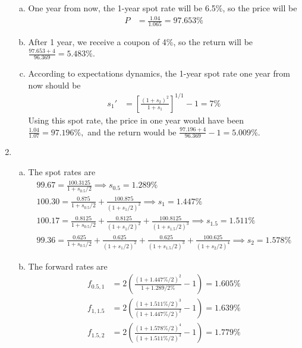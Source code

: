 \documentclass{article}
\begin{document}
\begin{enumerate}[1.]
\begin{enumerate}[(a)]
			\item 
				\begin{soln}
					One year from now, the 1-year spot rate will be 6.5\%, so the price will be
					\begin{align*}
						P &= \frac{1.04}{1.065} = \boxed{97.653\%}
					\end{align*}
				\end{soln}

			\item 
				\begin{soln}
					After 1 year, we receive a coupon of 4\%, so the return will be $\frac{97.653+4}{96.369} = \boxed{5.483\%.}$
				\end{soln}

			\item 
				\begin{soln}
					According to expectations dynamics, the 1-year spot rate one year from now should be
					\begin{align*}
						s_1' &= \left[ \frac{(1+s_2)^2}{1+s_1} \right]^{1/1} - 1 = 7\%
					\end{align*}
					Using this spot rate, the price in one year would have been $\frac{1.04}{1.07} = 97.196\%,$ and the return would be $\frac{97.196+4}{96.369}-1 = \boxed{5.009\%.}$
				\end{soln}
				
		\end{enumerate}

	\item 
		\begin{enumerate}[(a)]
			\item 
				\begin{soln}
					The spot rates are
					\begin{align*}
						99.67 = \frac{100.3125}{1+s_{0.5}/2} \implies s_{0.5} = 1.289\% \\
						100.30 = \frac{0.875}{1+s_{0.5}/2} + \frac{100.875}{(1+s_1/2)^2} \implies s_1 = 1.447\% \\
						100.17 = \frac{0.8125}{1+s_{0.5}/2} + \frac{0.8125}{(1+s_1/2)^2} + \frac{100.8125}{(1+s_{1.5}/2)^3} \implies s_{1.5} = 1.511\% \\
						99.36 = \frac{0.625}{1+s_{0.5}/2} + \frac{0.625}{(1+s_1/2)^2} + \frac{0.625}{(1+s_{1.5}/2)^3} + \frac{100.625}{(1+s_2/2)^4} \implies s_2 = 1.578\%
					\end{align*}
				\end{soln}

			\item 
				\begin{soln}
					The forward rates are
					\begin{align*}
						f_{0.5, 1} &= 2\left(\frac{(1+1.447\%/2)^2}{1+1.289/2\%}-1\right) = 1.605\% \\
						f_{1, 1.5} &= 2\left( \frac{(1+1.511\%/2)^3}{(1+1.447\%/2)^2}-1 \right) = 1.639\% \\
						f_{1.5, 2} &= 2\left( \frac{(1+1.578\%/2)^4}{(1+1.511\%/2)^3}-1 \right) = 1.779\%
					\end{align*}
				\end{soln}
		\end{enumerate}


\end{enumerate}
\end{document}

